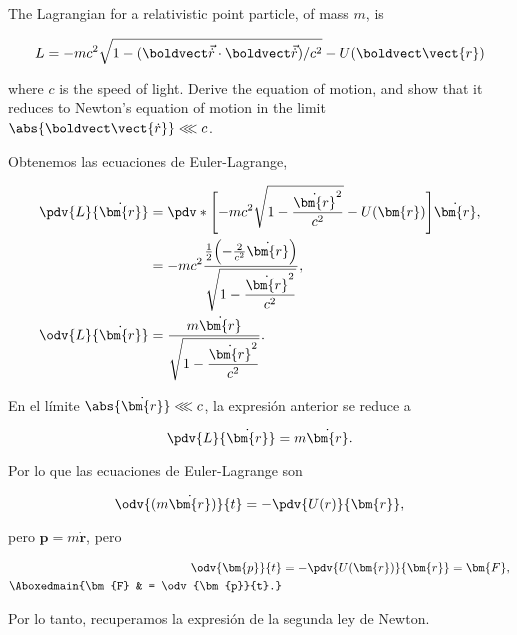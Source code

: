 \documentclass[../main.tex]{subfiles}
\begin{document}
\begin{problema}
	The Lagrangian for a relativistic point particle, of mass \(m\), is

	\begin{equation*}
		L = -mc^{2}\sqrt{1 - (\boldvect\vec{\dot{r}}\cdot \boldvect\vec{\dot{r}})/c^{2}} - U(\boldvect\vect{r})
	\end{equation*}

	where \(c\) is the speed of light. Derive the equation of motion, and
	show that it reduces to Newton's equation of motion in the limit
	\( \abs{\boldvect\vect{\dot{r}}} \lll c\).
\end{problema}

\startsolution

Obtenemos las ecuaciones de Euler-Lagrange,

\begin{align*}
	\pdv{L}{\dot{\bm{r}}} & = \pdv*{\Biggl[-mc^{2}\sqrt{1 - \dfrac{\dot{\bm{r}}^{2}}{c^{2}}} - U(\bm{r})\Biggr]}{\dot{\bm{r}}},\nonumber                 \\
	                      & = -mc^{2}\dfrac{\tfrac{1}{2}\Bigl(-\tfrac{2}{c^{2}}\dot{\bm{r}}\Bigr)}{\sqrt{1 - \dfrac{\dot{\bm{r}}^{2}}{c^{2}}}},\nonumber \\
	\odv{L}{\dot{\bm{r}}} & = \dfrac{m \dot{\bm{r}}}{\sqrt{1 - \dfrac{\dot{\bm{r}}^{2}}{c^{2}}}}.
\end{align*}

En el límite \(\abs{\dot{\bm{r}}} \lll c\), la expresión anterior se reduce a

\begin{equation*}
	\pdv{L}{\dot{\bm{r}}} = m \dot{\bm{r}}.
\end{equation*}

Por lo que las ecuaciones de Euler-Lagrange son

\begin{equation*}
	\odv{(m \dot{\bm{r}})}{t} = -\pdv{U(r)}{\bm{r}},
\end{equation*}

pero \(\bm{p} = m \dot{\bm{r}}\), pero

\begin{align*}
	\odv{\bm{p}}{t}    & = -\pdv{U(\bm{r})}{\bm{r}} = \bm{F}, \\
	\Aboxedmain{\bm{F} & = \odv{\bm{p}}{t}.}
\end{align*}

Por lo tanto, recuperamos la expresión de la segunda ley de Newton.
\end{document}

